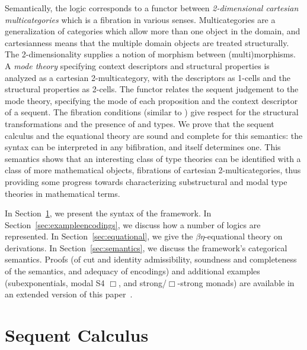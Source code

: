 \documentclass[a4paper,USenglish]{lipics-v2016}
\newcommand\deq{\ensuremath{\equiv}}
\newcommand\spr{\ensuremath{\Rightarrow}} %
\newcommand\citep[1]{\cite{#1}}
\begin{document}
Semantically, the logic corresponds to a functor between
\emph{2-dimensional cartesian multicategories} which is a fibration in
various senses.  Multicategories are a generalization of categories
which allow more than one object in the domain, and cartesianness means
that the multiple domain objects are treated structurally.  The
2-dimensionality supplies a notion of morphism between (multi)morphisms.
A \emph{mode theory} specifying context descriptors and structural
properties is analyzed as a cartesian 2-multicategory, with the
descriptors as 1-cells and the structural properties as 2-cells.  The
functor relates the sequent judgement to the mode theory, specifying the
mode of each proposition and the context descriptor of a sequent.  The
fibration conditions (similar to
\citep{hermida02fibrations,hormann15multicategories}) give respect for
the structural transformations and the presence of  and 
types.  We prove that the sequent calculus and the equational theory are
sound and complete for this semantics: the syntax can be interpreted in
any bifibration, and itself determines one.  This semantics shows that
an interesting class of type theories can be identified with a class of
more mathematical objects, fibrations of cartesian 2-multicategories,
thus providing some progress towards characterizing substructural
and modal type theories in mathematical terms.

In Section~\ref{sec:syntax}, we present the syntax of the framework.  In
Section~\ref{sec:exampleencodings}, we discuss how a number of logics
are represented.  In Section~\ref{sec:equational}, we give the
$\beta\eta$-equational theory on derivations.  In
Section~\ref{sec:semantics}, we discuss the framework's categorical
semantics.  Proofs (of cut and identity admissibility, soundness and
completeness of the semantics, and adequacy of encodings) and additional
examples (subexponentials, modal S4 $\Box$, and strong/$\Box$-strong
monads) are available in an extended version of this paper~\citep{lsr17multi-extended}.


\newcommand\wfsp[4]{\ensuremath{#1 \vdash #2 \spr_{#4} #3}}

\section{Sequent Calculus}
\label{sec:syntax}

\newcommand\wfsig[1]{\ensuremath{#1 \, \dsd{sig}}}
\newcommand\deqtms[5]{\ensuremath{#1 \vdash_{#2} #3 \deq #4 : #5}}
\newcommand\wfsps[5]{\ensuremath{#1 \vdash_{#2} #3 \spr_{#5} #4}}
\end{document}
